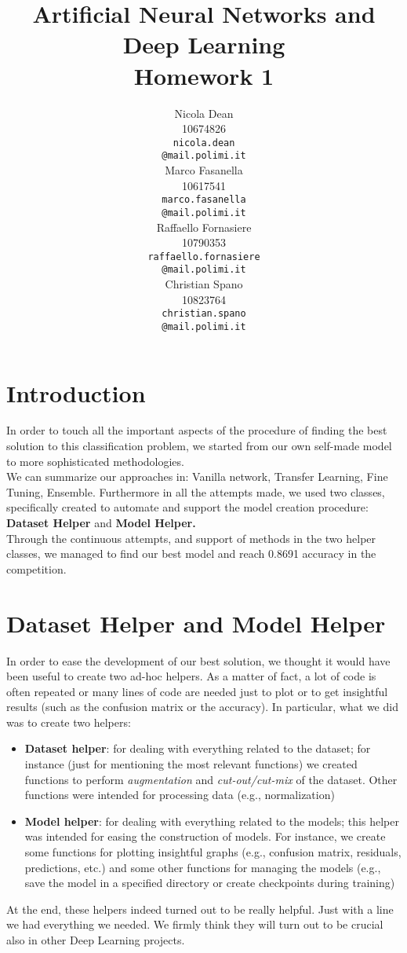 \documentclass[11pt]{article}
\title{Artificial Neural Networks and Deep Learning \\
Homework 1}
\author{
  Nicola Dean \\
  10674826 \\
  {\tt nicola.dean \\
  \tt @mail.polimi.it} \\\And
  Marco Fasanella \\
  10617541 \\
  {\tt marco.fasanella \\
  \tt @mail.polimi.it} \\\And
  Raffaello Fornasiere \\
    10790353 \\
    {\tt raffaello.fornasiere \\
    \tt @mail.polimi.it} \\\And
  Christian Spano \\
  10823764 \\
  {\tt christian.spano \\
  \tt @mail.polimi.it} \\}
\date{}
\begin{document}
\maketitle



\section{Introduction}
In order to touch all the important aspects of the procedure of finding the best solution to this classification problem,
we started from our own self-made model to more sophisticated methodologies.\\[0.1cm]
 We can summarize our approaches in: Vanilla network, Transfer Learning, Fine Tuning, Ensemble. Furthermore in all the attempts made, we used two classes, specifically created to automate and support the model creation
procedure: \textbf{Dataset Helper} and \textbf{Model Helper.}\\[0.1cm]
Through the continuous attempts, and support of methods in the two helper classes, we managed to find our best model and
reach 0.8691 accuracy in the competition.


\section{Dataset Helper and Model Helper}
In order to ease the development of our best solution, we thought it would have been useful to create two ad-hoc helpers. As a matter of fact, a lot of code is often repeated or many lines of code are needed just to plot or to get insightful results (such as the confusion matrix or the accuracy). In particular, what we did was to create two helpers:
\begin{itemize}
    \item \textbf{Dataset helper}: for dealing with everything related to the dataset; for instance (just for mentioning the most relevant functions) we created functions to perform \textit{augmentation} and \textit{cut-out/cut-mix} of the dataset. Other functions were intended for processing data (e.g., normalization)
    \item \textbf{Model helper}: for dealing with everything related to the models; this helper was intended for easing the construction of models. For instance, we create some functions for plotting insightful graphs (e.g., confusion matrix, residuals, predictions, etc.) and some other functions for managing the models (e.g., save the model in a specified directory or create checkpoints during training)
\end{itemize}
At the end, these helpers indeed turned out to be really helpful. Just with a line we had everything we needed. We firmly think they will turn out to be crucial also in other Deep Learning projects.
\end{document}
